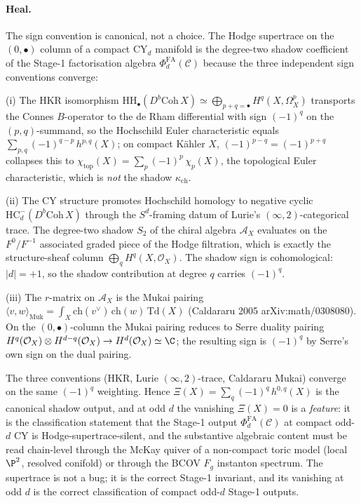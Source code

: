 \paragraph{Heal.} The sign convention is canonical, not a choice. The
Hodge supertrace on the $(0, \bullet)$ column of a compact CY$_d$
manifold is the degree-two shadow coefficient of the Stage-1
factorisation algebra $\Phi^{\mathrm{FA}}_d(\mathcal{C})$ because the
three independent sign conventions converge:

(i) The HKR isomorphism
$\mathrm{HH}_\bullet(D^b\mathrm{Coh}\, X) \simeq
\bigoplus_{p + q = \bullet} H^q(X, \Omega^p_X)$ transports the
Connes $B$-operator to the de Rham differential with sign
$(-1)^q$ on the $(p, q)$-summand, so the Hochschild Euler
characteristic equals
$\sum_{p, q} (-1)^{q - p}\, h^{p, q}(X)$; on compact K\"ahler $X$,
$(-1)^{p - q} = (-1)^{p + q}$ collapses this to
$\chi_{\mathrm{top}}(X) = \sum_p (-1)^p\, \chi_p(X)$, the
topological Euler characteristic, which is \emph{not} the shadow
$\kappa_{\mathrm{ch}}$.

(ii) The CY structure promotes Hochschild homology to negative
cyclic $\mathrm{HC}^-_d(D^b\mathrm{Coh}\, X)$ through the
$S^d$-framing datum of Lurie's $(\infty, 2)$-categorical trace.
The degree-two shadow $S_2$ of the chiral algebra $\mathcal{A}_X$
evaluates on the $F^0/F^{-1}$ associated graded piece of the Hodge
filtration, which is exactly the structure-sheaf column
$\bigoplus_q H^q(X, \mathcal{O}_X)$. The shadow sign is
cohomological: $|d| = +1$, so the shadow contribution at degree $q$
carries $(-1)^q$.

(iii) The $r$-matrix on $\mathcal{A}_X$ is the Mukai pairing
$\langle v, w \rangle_{\mathrm{Muk}} = \int_X \mathrm{ch}(v^\vee)\,
\mathrm{ch}(w)\, \mathrm{Td}(X)$ (Caldararu 2005
arXiv:math/0308080). On the $(0, \bullet)$-column the Mukai pairing
reduces to Serre duality pairing $H^q(\mathcal{O}_X) \otimes
H^{d - q}(\mathcal{O}_X) \to H^d(\mathcal{O}_X) \simeq \C$; the
resulting sign is $(-1)^q$ by Serre's own sign on the dual pairing.

The three conventions (HKR, Lurie $(\infty, 2)$-trace, Caldararu
Mukai) converge on the same $(-1)^q$ weighting. Hence
$\Xi(X) = \sum_q (-1)^q\, h^{0, q}(X)$ is the canonical shadow
output, and at odd $d$ the vanishing $\Xi(X) = 0$ is a
\emph{feature}: it is the classification statement that the
Stage-1 output $\Phi^{\mathrm{FA}}_d(\mathcal{C})$ at compact odd-$d$
CY is Hodge-supertrace-silent, and the substantive algebraic content
must be read chain-level through the McKay quiver of a non-compact
toric model (local $\P^2$, resolved conifold) or through the BCOV
$F_g$ instanton spectrum. The supertrace is not a bug; it is the
correct Stage-1 invariant, and its vanishing at odd $d$ is the
correct classification of compact odd-$d$ Stage-1 outputs.

